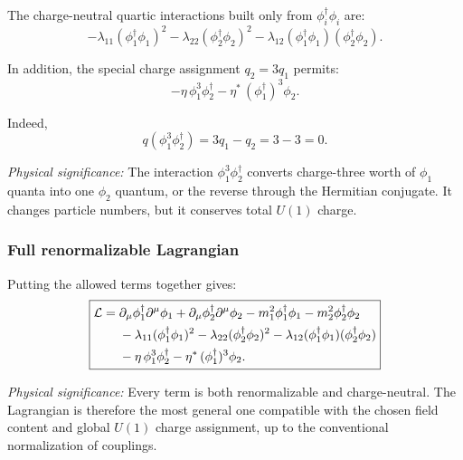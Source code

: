 \documentclass[../main.tex]{subfiles}
\begin{document}
The charge-neutral quartic interactions built only from $\phi_i^\dagger\phi_i$ are:
\begin{equation}
  \boxed{
  -\lambda_{11}(\phi_1^\dagger\phi_1)^2
  -\lambda_{22}(\phi_2^\dagger\phi_2)^2
  -\lambda_{12}(\phi_1^\dagger\phi_1)(\phi_2^\dagger\phi_2).}
  \label{eq:lec09:two-scalar-quartics}
\end{equation}

In addition, the special charge assignment $q_2=3q_1$ permits:
\begin{equation}
  \boxed{
  -\eta\,\phi_1^3\phi_2^\dagger
  -\eta^*\,(\phi_1^\dagger)^3\phi_2.}
  \label{eq:lec09:eta-interaction}
\end{equation}

Indeed,
\begin{equation}
  q(\phi_1^3\phi_2^\dagger)=3q_1-q_2=3-3=0.
  \label{eq:lec09:eta-charge-check}
\end{equation}

\textit{Physical significance:} The interaction $\phi_1^3\phi_2^\dagger$ converts charge-three worth of $\phi_1$ quanta into one $\phi_2$ quantum, or the reverse through the Hermitian conjugate.  It changes particle numbers, but it conserves total $U(1)$ charge.

\subsubsection*{Full renormalizable Lagrangian}

Putting the allowed terms together gives:
\begin{equation}
  \boxed{
  \begin{aligned}
  \mathcal{L}
  ={}&
  \partial_\mu\phi_1^\dagger\partial^\mu\phi_1
  +
  \partial_\mu\phi_2^\dagger\partial^\mu\phi_2
  -
  m_1^2\phi_1^\dagger\phi_1
  -
  m_2^2\phi_2^\dagger\phi_2
  \\
  &-\lambda_{11}(\phi_1^\dagger\phi_1)^2
  -\lambda_{22}(\phi_2^\dagger\phi_2)^2
  -\lambda_{12}(\phi_1^\dagger\phi_1)(\phi_2^\dagger\phi_2)
  \\
  &-\eta\,\phi_1^3\phi_2^\dagger
  -\eta^*\,(\phi_1^\dagger)^3\phi_2 .
  \end{aligned}}
  \label{eq:lec09:two-scalar-full-lagrangian}
\end{equation}

\textit{Physical significance:} Every term is both renormalizable and charge-neutral.  The Lagrangian is therefore the most general one compatible with the chosen field content and global $U(1)$ charge assignment, up to the conventional normalization of couplings.
\end{document}
